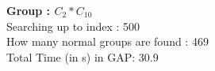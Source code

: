 \textbf{Group : $C_2*C_{10}$}\\
Searching up to index : 500\\
How many normal groups are found : 469\\
Total Time (in s) in GAP: 30.9\\
